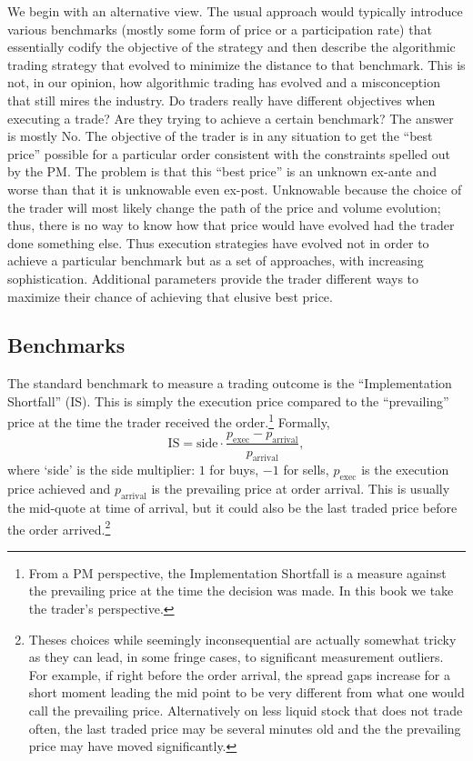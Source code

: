 We begin with an alternative view. The usual approach would typically introduce various benchmarks (mostly some form of price or a participation rate) that essentially codify the objective of the strategy and then describe the algorithmic trading strategy that evolved to minimize the distance to that benchmark. This is not, in our opinion, how algorithmic trading has evolved and a misconception that still mires the industry. Do traders really have different objectives when executing a trade? Are they trying to achieve a certain benchmark? The answer is mostly No. The objective of the trader is in any situation to get the ``best price'' possible for a particular order consistent with the constraints spelled out by the PM. The problem is that this ``best price''  is an unknown ex-ante and worse than that it is unknowable even ex-post. Unknowable because the choice of the trader will most likely change the path of the price and volume evolution; thus, there is no way to know how that price would have evolved had the trader done something else. Thus execution strategies have evolved not in order to achieve a particular benchmark but as a set of approaches, with increasing sophistication. Additional parameters provide the trader different ways to maximize their chance of achieving that elusive best price.



\subsection{Benchmarks \label{s:benchmarks}}

The standard benchmark to measure a trading outcome is the ``Implementation Shortfall'' (IS). This is simply the execution price compared to the ``prevailing'' price at the time the trader received the order.\footnote{From a PM perspective, the Implementation Shortfall is a measure against the prevailing price at the time the decision was made. In this book we take the trader's perspective.} Formally,
        \begin{equation}
        \text{IS} = \text{side} \cdot \frac{p_{\text{exec}} - p_{\text{arrival}}}{p_{\text{arrival}}},
        \end{equation}
where `side' is the side multiplier: $1$ for buys, $-1$ for sells, $p_{\text{exec}}$ is the execution price achieved and $p_{\text{arrival}}$ is the prevailing price at order arrival. This is usually the mid-quote at time of arrival, but it could also be the last traded price before the order arrived.\footnote{Theses choices while seemingly inconsequential are actually somewhat tricky as they can lead, in some fringe cases, to significant measurement outliers. For example, if right before the order arrival, the spread gaps increase for a short moment leading the mid point to be very different from what one would call the prevailing price. Alternatively on less liquid stock that does not trade often, the last traded price may be several minutes old and the the prevailing price may have moved significantly.}


